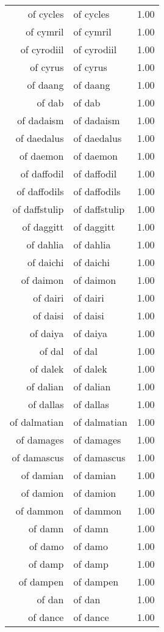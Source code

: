 \begin{table}[ht]
\begin{tabular}{rlr}
  of cycles & of cycles & 1.00 \\ 
  of cymril & of cymril & 1.00 \\ 
  of cyrodiil & of cyrodiil & 1.00 \\ 
  of cyrus & of cyrus & 1.00 \\ 
  of daang & of daang & 1.00 \\ 
  of dab & of dab & 1.00 \\ 
  of dadaism & of dadaism & 1.00 \\ 
  of daedalus & of daedalus & 1.00 \\ 
  of daemon & of daemon & 1.00 \\ 
  of daffodil & of daffodil & 1.00 \\ 
  of daffodils & of daffodils & 1.00 \\ 
  of daffstulip & of daffstulip & 1.00 \\ 
  of daggitt & of daggitt & 1.00 \\ 
  of dahlia & of dahlia & 1.00 \\ 
  of daichi & of daichi & 1.00 \\ 
  of daimon & of daimon & 1.00 \\ 
  of dairi & of dairi & 1.00 \\ 
  of daisi & of daisi & 1.00 \\ 
  of daiya & of daiya & 1.00 \\ 
  of dal & of dal & 1.00 \\ 
  of dalek & of dalek & 1.00 \\ 
  of dalian & of dalian & 1.00 \\ 
  of dallas & of dallas & 1.00 \\ 
  of dalmatian & of dalmatian & 1.00 \\ 
  of damages & of damages & 1.00 \\ 
  of damascus & of damascus & 1.00 \\ 
  of damian & of damian & 1.00 \\ 
  of damion & of damion & 1.00 \\ 
  of dammon & of dammon & 1.00 \\ 
  of damn & of damn & 1.00 \\ 
  of damo & of damo & 1.00 \\ 
  of damp & of damp & 1.00 \\ 
  of dampen & of dampen & 1.00 \\ 
  of dan & of dan & 1.00 \\ 
  of dance & of dance & 1.00 \\ 

\end{tabular}
\end{table}

